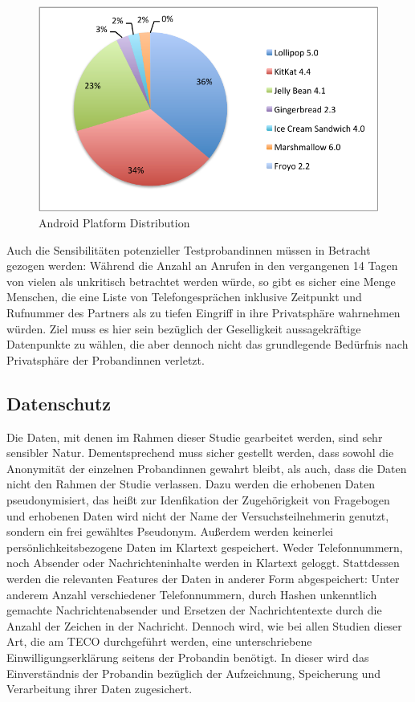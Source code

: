 \begin{figure}[h]
    \centering
    \includegraphics{images/chart.pdf}
    \caption{Android Platform Distribution\cite{androiddistr}}
    \label{fig:androidplatformdistr}
\end{figure}

Auch die Sensibilitäten potenzieller Testprobandinnen müssen in Betracht gezogen werden:
Während die Anzahl an Anrufen in den vergangenen 14 Tagen von vielen als unkritisch betrachtet werden würde, so gibt es sicher eine Menge Menschen, 
die eine Liste von Telefongesprächen inklusive Zeitpunkt und Rufnummer des Partners als zu tiefen Eingriff in ihre Privatsphäre wahrnehmen würden.
Ziel muss es hier sein bezüglich der Geselligkeit aussagekräftige Datenpunkte zu wählen, 
die aber dennoch nicht das grundlegende Bedürfnis nach Privatsphäre der Probandinnen verletzt.


\subsection{Datenschutz}

Die Daten, mit denen im Rahmen dieser Studie gearbeitet werden, sind sehr sensibler Natur.
Dementsprechend muss sicher gestellt werden, dass sowohl die Anonymität der einzelnen Probandinnen gewahrt bleibt,
als auch, dass die Daten nicht den Rahmen der Studie verlassen.
Dazu werden die erhobenen Daten pseudonymisiert, das heißt zur Idenfikation der Zugehörigkeit von Fragebogen und erhobenen Daten wird nicht der Name der Versuchsteilnehmerin genutzt, sondern ein frei gewähltes Pseudonym.
Außerdem werden keinerlei persönlichkeitsbezogene Daten im Klartext gespeichert.
Weder Telefonnummern, noch Absender oder Nachrichteninhalte werden in Klartext geloggt.
Stattdessen werden die relevanten Features der Daten in anderer Form abgespeichert:
Unter anderem Anzahl verschiedener Telefonnummern, durch Hashen unkenntlich gemachte Nachrichtenabsender und Ersetzen der Nachrichtentexte durch die Anzahl der Zeichen in der Nachricht.
Dennoch wird, wie bei allen Studien dieser Art, die am TECO durchgeführt werden,
eine unterschriebene Einwilligungserklärung seitens der Probandin benötigt.
In dieser wird das Einverständnis der Probandin bezüglich der Aufzeichnung, Speicherung und Verarbeitung ihrer Daten zugesichert.
\par



